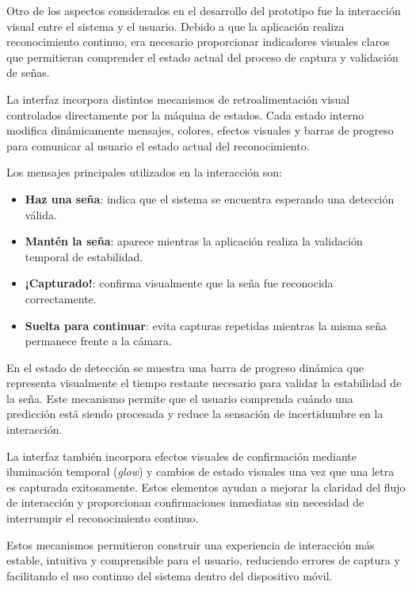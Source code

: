	Otro de los aspectos considerados en el desarrollo del prototipo fue la interacción visual entre el sistema y el usuario. Debido a que la aplicación realiza reconocimiento continuo, era necesario proporcionar indicadores visuales claros que permitieran comprender el estado actual del proceso de captura y validación de señas.
	
	La interfaz incorpora distintos mecanismos de retroalimentación visual controlados directamente por la máquina de estados. Cada estado interno modifica dinámicamente mensajes, colores, efectos visuales y barras de progreso para comunicar al usuario el estado actual del reconocimiento.
	
	Los mensajes principales utilizados en la interacción son:
	
	\begin{itemize}
		\item \textbf{Haz una seña}: indica que el sistema se encuentra esperando una detección válida.
		
		\item \textbf{Mantén la seña}: aparece mientras la aplicación realiza la validación temporal de estabilidad.
		
		\item \textbf{¡Capturado!}: confirma visualmente que la seña fue reconocida correctamente.
		
		\item \textbf{Suelta para continuar}: evita capturas repetidas mientras la misma seña permanece frente a la cámara.
	\end{itemize}
	

	
	En el estado de detección se muestra una barra de progreso dinámica que representa visualmente el tiempo restante necesario para validar la estabilidad de la seña. Este mecanismo permite que el usuario comprenda cuándo una predicción está siendo procesada y reduce la sensación de incertidumbre en la interacción.
	
	La interfaz también incorpora efectos visuales de confirmación mediante iluminación temporal (\textit{glow}) y cambios de estado visuales una vez que una letra es capturada exitosamente. Estos elementos ayudan a mejorar la claridad del flujo de interacción y proporcionan confirmaciones inmediatas sin necesidad de interrumpir el reconocimiento continuo.
	
	Estos mecanismos permitieron construir una experiencia de interacción más estable, intuitiva y comprensible para el usuario, reduciendo errores de captura y facilitando el uso continuo del sistema dentro del dispositivo móvil.
	
